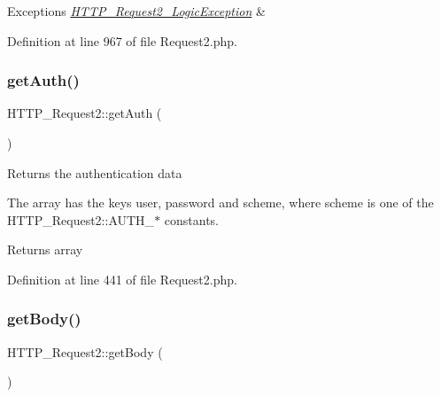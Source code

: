 \begin{DoxyExceptions}{Exceptions}
{\em \hyperlink{classHTTP__Request2__LogicException}{H\+T\+T\+P\+\_\+\+Request2\+\_\+\+Logic\+Exception}} & \\
\hline
\end{DoxyExceptions}


Definition at line 967 of file Request2.\+php.

\mbox{\label{classHTTP__Request2_a92573cc9573e255bd2a9fe476153898f}} 
\subsubsection{\texorpdfstring{get\+Auth()}{getAuth()}}
{\footnotesize\ttfamily H\+T\+T\+P\+\_\+\+Request2\+::get\+Auth (\begin{DoxyParamCaption}{ }\end{DoxyParamCaption})}

Returns the authentication data

The array has the keys \textquotesingle{}user\textquotesingle{}, \textquotesingle{}password\textquotesingle{} and \textquotesingle{}scheme\textquotesingle{}, where \textquotesingle{}scheme\textquotesingle{} is one of the H\+T\+T\+P\+\_\+\+Request2\+::\+A\+U\+T\+H\+\_\+$\ast$ constants.

\begin{DoxyReturn}{Returns}
array 
\end{DoxyReturn}


Definition at line 441 of file Request2.\+php.

\mbox{\label{classHTTP__Request2_a206f758763ed28dce4341babf5c932d0}} 
\subsubsection{\texorpdfstring{get\+Body()}{getBody()}}
{\footnotesize\ttfamily H\+T\+T\+P\+\_\+\+Request2\+::get\+Body (\begin{DoxyParamCaption}{ }\end{DoxyParamCaption})}

